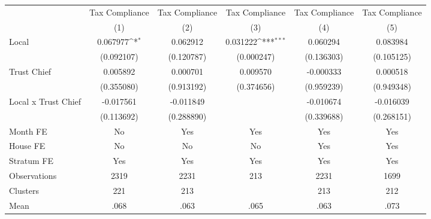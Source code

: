 {
\def\sym#1{\ifmmode^{#1}\else\(^{#1}\)\fi}
\begin{tabular}{l*{5}{c}}
\toprule
                &\multicolumn{1}{c}{Tax Compliance}&\multicolumn{1}{c}{Tax Compliance}&\multicolumn{1}{c}{Tax Compliance}&\multicolumn{1}{c}{Tax Compliance}&\multicolumn{1}{c}{Tax Compliance}\\
                &\multicolumn{1}{c}{(1)}         &\multicolumn{1}{c}{(2)}         &\multicolumn{1}{c}{(3)}         &\multicolumn{1}{c}{(4)}         &\multicolumn{1}{c}{(5)}         \\
\midrule
Local           & 0.067977\sym{*}  & 0.062912         & 0.031222\sym{***}& 0.060294         & 0.083984         \\
                &(0.092107)         &(0.120787)         &(0.000247)         &(0.136303)         &(0.105125)         \\
Trust Chief     & 0.005892         & 0.000701         & 0.009570         &-0.000333         & 0.000518         \\
                &(0.355080)         &(0.913192)         &(0.374656)         &(0.959239)         &(0.949348)         \\
Local x Trust Chief&-0.017561         &-0.011849         &                  &-0.010674         &-0.016039         \\
                &(0.113692)         &(0.288890)         &                  &(0.339688)         &(0.268151)         \\
Month FE        &       No         &      Yes         &      Yes         &      Yes         &      Yes         \\
House FE        &       No         &       No         &       No         &      Yes         &      Yes         \\
Stratum FE      &      Yes         &      Yes         &      Yes         &      Yes         &      Yes         \\
\midrule
Observations    &     2319         &     2231         &      213         &     2231         &     1699         \\
Clusters        &      221         &      213         &                  &      213         &      212         \\
Mean            &     .068         &     .063         &     .065         &     .063         &     .073         \\
\bottomrule
\end{tabular}
}
